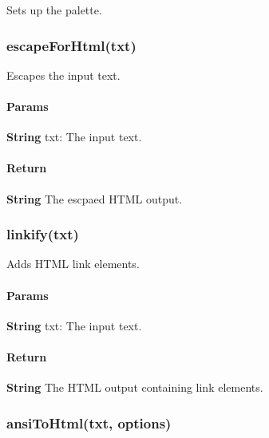 Sets up the palette.

\subsubsection*{{\ttfamily escape\+For\+Html(txt)}}

Escapes the input text. \paragraph*{Params}


\begin{DoxyItemize}
\item {\bfseries String} {\ttfamily txt}\+: The input text.
\end{DoxyItemize}

\paragraph*{Return}


\begin{DoxyItemize}
\item {\bfseries String} The escpaed H\+T\+ML output.
\end{DoxyItemize}

\subsubsection*{{\ttfamily linkify(txt)}}

Adds H\+T\+ML link elements. \paragraph*{Params}


\begin{DoxyItemize}
\item {\bfseries String} {\ttfamily txt}\+: The input text.
\end{DoxyItemize}

\paragraph*{Return}


\begin{DoxyItemize}
\item {\bfseries String} The H\+T\+ML output containing link elements.
\end{DoxyItemize}

\subsubsection*{{\ttfamily ansi\+To\+Html(txt, options)}}

